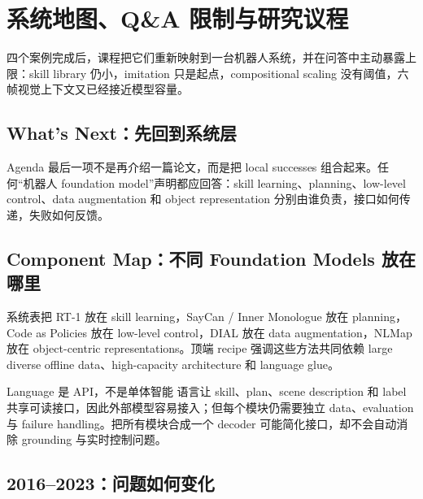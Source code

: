 \section{系统地图、Q\&A 限制与研究议程}

四个案例完成后，课程把它们重新映射到一台机器人系统，并在问答中主动暴露上限：skill library 仍小，imitation 只是起点，compositional scaling 没有阈值，六帧视觉上下文又已经接近模型容量。

\subsection{What's Next：先回到系统层}

Agenda 最后一项不是再介绍一篇论文，而是把 local successes 组合起来。任何“机器人 foundation model”声明都应回答：skill learning、planning、low-level control、data augmentation 和 object representation 分别由谁负责，接口如何传递，失败如何反馈。


\subsection{Component Map：不同 Foundation Models 放在哪里}

系统表把 RT-1 放在 skill learning，SayCan / Inner Monologue 放在 planning，Code as Policies 放在 low-level control，DIAL 放在 data augmentation，NLMap 放在 object-centric representations。顶端 recipe 强调这些方法共同依赖 large diverse offline data、high-capacity architecture 和 language glue。


\begin{importantbox}{Language 是 API，不是单体智能}
语言让 skill、plan、scene description 和 label 共享可读接口，因此外部模型容易接入；但每个模块仍需要独立 data、evaluation 与 failure handling。把所有模块合成一个 decoder 可能简化接口，却不会自动消除 grounding 与实时控制问题。
\end{importantbox}

\subsection{2016--2023：问题如何变化}

